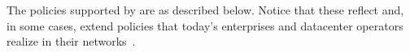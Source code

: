  The policies  supported by \Name are as described
 below. Notice that these reflect and, in some cases, extend policies
 that today's enterprises and datacenter operators
 realize in their networks~\cite{mpa-imc15}.





